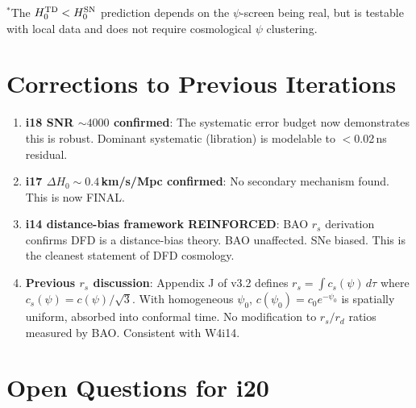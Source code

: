 \documentclass[11pt]{article}
\begin{document}
$^*$The $H_0^{\rm TD} < H_0^{\rm SN}$ prediction depends on the
$\psi$-screen being real, but is testable with local data and does not
require cosmological $\psi$ clustering.

\section{Corrections to Previous Iterations}

\begin{enumerate}
\item \textbf{i18 SNR $\sim 4000$ confirmed}: The systematic error
  budget now demonstrates this is robust. Dominant systematic
  (libration) is modelable to $<$0.02\,ns residual.

\item \textbf{i17 $\Delta H_0 \sim 0.4$\,km/s/Mpc confirmed}: No
  secondary mechanism found. This is now FINAL.

\item \textbf{i14 distance-bias framework REINFORCED}: BAO $r_s$
  derivation confirms DFD is a distance-bias theory. BAO unaffected.
  SNe biased. This is the cleanest statement of DFD cosmology.

\item \textbf{Previous $r_s$ discussion}: Appendix J of v3.2 defines
  $r_s = \int c_s(\psi)\,d\tau$ where $c_s(\psi) = c(\psi)/\sqrt{3}$.
  With homogeneous $\psi_0$, $c(\psi_0) = c_0 e^{-\psi_0}$ is spatially
  uniform, absorbed into conformal time. No modification to $r_s/r_d$
  ratios measured by BAO. Consistent with W4i14.
\end{enumerate}

\section{Open Questions for i20}
\end{document}
